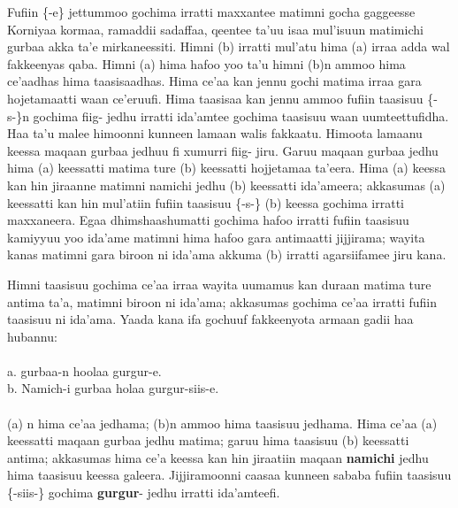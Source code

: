 \documentclass[11pt,b5paper]{book}
\begin{document}
Fufiin \{-e\} jettummoo gochima irratti maxxantee matimni gocha gaggeesse Korniyaa kormaa, ramaddii sadaffaa, qeentee ta’uu isaa mul’isuun matimichi gurbaa akka ta’e mirkaneessiti. Himni
(b) irratti mul’atu hima (a) irraa adda wal fakkeenyas qaba. Himni (a) hima hafoo yoo ta’u himni (b)n ammoo hima ce’aadhas hima taasisaadhas. Hima ce’aa kan jennu gochi matima irraa gara hojetamaatti waan ce’eruufi. Hima taasisaa kan jennu ammoo fufiin taasisuu \{-s-\}n gochima fiig- jedhu irratti
ida’amtee gochima taasisuu waan uumteettufidha. Haa ta’u malee himoonni kunneen lamaan walis fakkaatu. Himoota lamaanu keessa maqaan gurbaa jedhuu fi xumurri fiig- jiru. Garuu maqaan gurbaa jedhu hima (a) keessatti matima ture (b) keessatti hojjetamaa ta’eera. Hima (a) keessa kan hin jiraanne
matimni namichi jedhu (b) keessatti ida’ameera; akkasumas (a) keessatti kan hin mul’atiin fufiin taasisuu \{-s-\} (b) keessa gochima irratti maxxaneera. Egaa dhimshaashumatti gochima
hafoo irratti fufiin taasisuu kamiyyuu yoo ida’ame matimni hima hafoo gara antimaatti jijjirama; wayita kanas matimni gara biroon ni ida’ama akkuma (b) irratti agarsiifamee jiru kana. 

Himni taasisuu gochima ce’aa irraa wayita uumamus kan duraan matima ture antima ta’a, matimni biroon ni ida’ama; akkasumas gochima ce’aa irratti fufiin taasisuu ni ida’ama. Yaada kana ifa gochuuf fakkeenyota armaan gadii haa hubannu: \\
\\
a. gurbaa-n hoolaa gurgur-e.\\
b. Namich-i gurbaa holaa gurgur-siis-e.\\
\\
(a) n hima ce’aa jedhama; (b)n ammoo hima taasisuu jedhama. Hima ce’aa (a) keessatti maqaan gurbaa jedhu matima; garuu hima taasisuu (b) keessatti antima; akkasumas hima ce’a keessa kan hin jiraatiin maqaan \textbf{namichi} jedhu hima taasisuu keessa galeera. Jijjiramoonni caasaa kunneen sababa fufiin
taasisuu \{-siis-\} gochima \textbf{gurgur}- jedhu irratti ida’amteefi.
\end{document}
